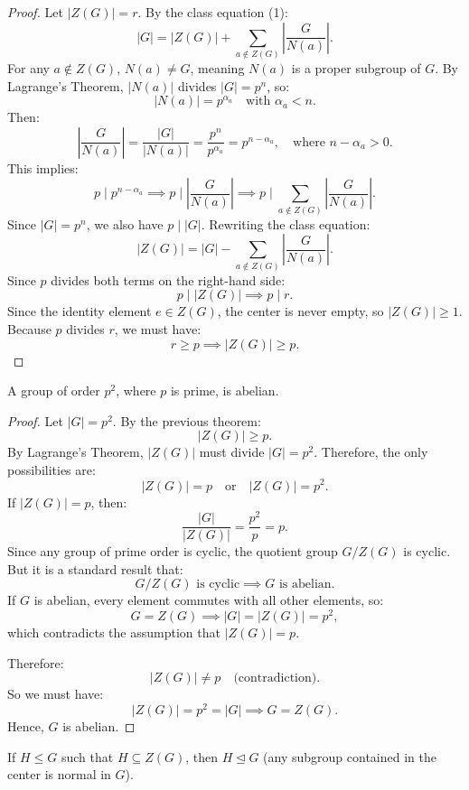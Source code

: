 \begin{proof}
Let $|Z(G)| = r$. By the class equation (1):
\[
|G| = |Z(G)| + \sum_{a \notin Z(G)} \left|\frac{G}{N(a)}\right|.
\]
For any $a \notin Z(G)$, $N(a) \neq G$, meaning $N(a)$ is a proper subgroup of $G$. By Lagrange's Theorem, $|N(a)|$ divides $|G| = p^n$, so:
\[
|N(a)| = p^{\alpha_a} \quad \text{with } \alpha_a < n.
\]
Then:
\[
\left|\frac{G}{N(a)}\right| = \frac{|G|}{|N(a)|} = \frac{p^n}{p^{\alpha_a}} = p^{n - \alpha_a}, \quad \text{where } n - \alpha_a > 0.
\]
This implies:
\[
p \mid p^{n - \alpha_a} \implies p \mid \left|\frac{G}{N(a)}\right| \implies p \mid \sum_{a \notin Z(G)} \left|\frac{G}{N(a)}\right|.
\]
Since $|G| = p^n$, we also have $p \mid |G|$. Rewriting the class equation:
\[
|Z(G)| = |G| - \sum_{a \notin Z(G)} \left|\frac{G}{N(a)}\right|.
\]
Since $p$ divides both terms on the right-hand side:
\[
p \mid |Z(G)| \implies p \mid r.
\]
Since the identity element $e \in Z(G)$, the center is never empty, so $|Z(G)| \ge 1$. Because $p$ divides $r$, we must have:
\[
r \ge p \implies |Z(G)| \ge p.
\]
\end{proof}

\begin{theorem}
A group of order $p^2$, where $p$ is prime, is abelian.
\end{theorem}

\begin{proof}
Let $|G| = p^2$. By the previous theorem:
\[
|Z(G)| \ge p.
\]
By Lagrange's Theorem, $|Z(G)|$ must divide $|G| = p^2$. Therefore, the only possibilities are:
\[
|Z(G)| = p \quad \text{or} \quad |Z(G)| = p^2.
\]
If $|Z(G)| = p$, then:
\[
\frac{|G|}{|Z(G)|} = \frac{p^2}{p} = p.
\]
Since any group of prime order is cyclic, the quotient group $G/Z(G)$ is cyclic. But it is a standard result that:
\[
G/Z(G) \text{ is cyclic} \implies G \text{ is abelian}.
\]
If $G$ is abelian, every element commutes with all other elements, so:
\[
G = Z(G) \implies |G| = |Z(G)| = p^2,
\]
which contradicts the assumption that $|Z(G)| = p$.

Therefore:
\[
|Z(G)| \neq p \quad \text{(contradiction)}.
\]
So we must have:
\[
|Z(G)| = p^2 = |G| \implies G = Z(G).
\]
Hence, $G$ is abelian.
\end{proof}

\begin{remark}
If $H \le G$ such that $H \subseteq Z(G)$, then $H \trianglelefteq G$ (any subgroup contained in the center is normal in $G$).
\end{remark}
